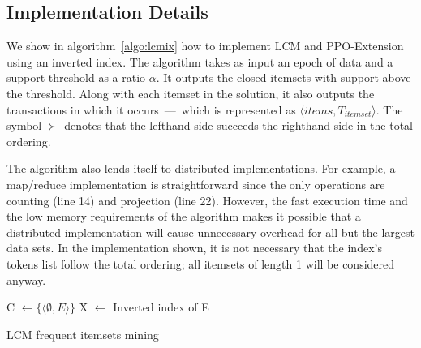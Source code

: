 \documentclass{sig-alternate}
\begin{document}
\subsection{Implementation Details}
We show in algorithm~\ref{algo:lcmix} how to implement LCM and PPO-Extension
using an inverted index.
The algorithm takes as input an epoch of data and a support threshold as a
ratio $\alpha$.
It outputs the closed itemsets with support above the threshold.
Along with each itemset in the solution, it also outputs the transactions
in which it occurs~---~which is represented as $\langle items,
T_{itemset} \rangle$.
The symbol $\succ$ denotes that the lefthand side  succeeds the righthand
side in the total ordering.

The algorithm also lends itself to distributed implementations.
For example, a map/reduce implementation is straightforward since the only
operations are counting (line 14) and projection (line 22).
However, the fast execution time and the low memory requirements of the
algorithm makes it possible that a distributed implementation will
cause unnecessary overhead for all but the largest data sets.
In the implementation shown, it is not necessary that the index's tokens list
follow the total ordering; all itemsets of length 1 will be considered anyway. 

\begin{algorithm}
\SetAlgoLined
\LinesNumbered
{}

C $\gets \{\langle \emptyset, E\rangle\}$ 
X $\gets$ Inverted index of E\;
\;


\caption{LCM frequent itemsets mining}
\label{algo:lcmix}
\end{algorithm}
\end{document}
